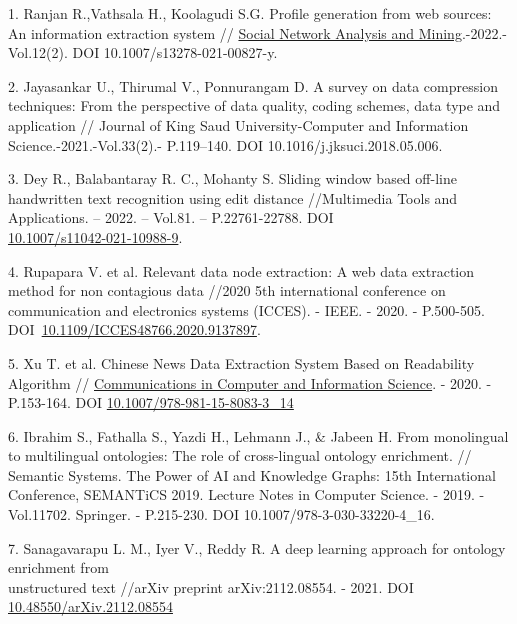 \begin{references}
1. Ranjan R.,Vathsala H., Koolagudi S.G. Profile generation from web
sources: An information extraction system //
\href{https://link.springer.com/journal/13278}{Social Network Analysis
and Mining}.-2022.-Vol.12(2). DOI 10.1007/s13278-021-00827-y.

2. Jayasankar U., Thirumal V., Ponnurangam D. A survey on data
compression techniques: From the perspective of data quality, coding
schemes, data type and application // Journal of King Saud
University-Computer and Information Science.-2021.-Vol.33(2).-
P.119--140. DOI 10.1016/j.jksuci.2018.05.006.

3. Dey R., Balabantaray R. C., Mohanty S. Sliding window based off-line
handwritten text recognition using edit distance //Multimedia Tools and
Applications. -- 2022. -- Vol.81. -- P.22761-22788. DOI\\
\href{https://link.springer.com/article/10.1007/s11042-021-10988-9}{10.1007/s11042-021-10988-9}.

4. Rupapara V. et al. Relevant data node extraction: A web data
extraction method for non contagious data //2020 5th international
conference on communication and electronics systems (ICCES). - IEEE. -
2020. - P.500-505.
DOI~\href{https://doi.org/10.1109/ICCES48766.2020.9137897}{10.1109/ICCES48766.2020.9137897}.

5. Xu T. et al. Chinese News Data Extraction System Based on Readability
Algorithm //
\href{https://www.researchgate.net/journal/Communications-in-Computer-and-Information-Science-1865-0929?_tp=eyJjb250ZXh0Ijp7ImZpcnN0UGFnZSI6InB1YmxpY2F0aW9uIiwicGFnZSI6InB1YmxpY2F0aW9uIn19}{Communications
in Computer and Information Science}. - 2020. - P.153-164. DOI
\href{http://dx.doi.org/10.1007/978-981-15-8083-3_14}{10.1007/978-981-15-8083-3\_14}

6. Ibrahim S., Fathalla S., Yazdi H., Lehmann J., \& Jabeen H. From
monolingual to multilingual ontologies: The role of cross-lingual
ontology enrichment. // Semantic Systems. The Power of AI and Knowledge
Graphs: 15th International Conference, SEMANTiCS 2019. Lecture Notes in
Computer Science. - 2019. -Vol.11702. Springer. - P.215-230. DOI
10.1007/978-3-030-33220-4\_16.

7. Sanagavarapu L. M., Iyer V., Reddy R. A deep learning approach for
ontology enrichment from \\unstructured text //arXiv preprint
arXiv:2112.08554. - 2021. DOI
\href{http://dx.doi.org/10.48550/arXiv.2112.08554}{10.48550/arXiv.2112.08554}


\end{references}
